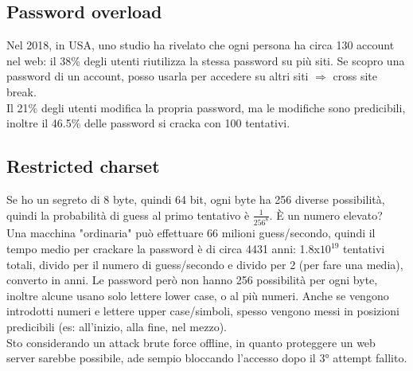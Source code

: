 \documentclass[16px]{article}
\begin{document}
\subsection{Password overload}
Nel 2018, in USA, uno studio ha rivelato che ogni persona ha circa 130 account nel web: il 38\% degli utenti riutilizza la stessa password su più siti. Se scopro una password di un account, posso usarla per accedere su altri siti $\Rightarrow$ cross site break.\\ Il 21\% degli utenti modifica la propria password, ma le modifiche sono predicibili, inoltre il 46.5\% delle password si cracka con 100 tentativi.
\subsection{Restricted charset}
Se ho un segreto di 8 byte, quindi 64 bit, ogni byte ha 256 diverse possibilità, quindi la probabilità di guess al primo tentativo è $\frac{1}{256^8}$. È un numero elevato? \\ Una macchina "ordinaria" può effettuare 66 milioni guess/secondo, quindi il tempo medio per crackare la password è di circa 4431 anni: 1.8x$10^{19}$ tentativi totali, divido per il numero di guess/secondo e divido per 2 (per fare una media), converto in anni.
Le password però non hanno 256 possibilità per ogni byte, inoltre alcune usano solo lettere lower case, o al più numeri. Anche se vengono introdotti numeri e lettere upper case/simboli, spesso vengono messi in posizioni predicibili (es: all'inizio, alla fine, nel mezzo). \\ Sto considerando un attack brute force offline, in quanto proteggere un web server sarebbe possibile, ade sempio bloccando l'accesso dopo il 3° attempt fallito.
\end{document}

